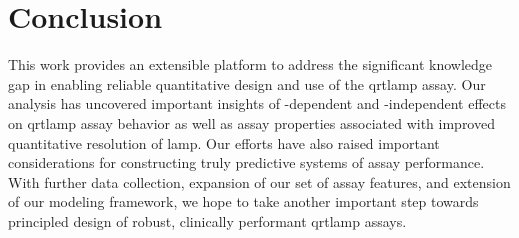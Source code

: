 \documentclass[../thesis.tex]{subfiles}
\begin{document}



%
%






\section{Conclusion}

This work provides an extensible platform to address the significant knowledge gap in enabling reliable quantitative design and use of the \gls{qrtlamp} assay. 
Our analysis has uncovered important insights of -dependent and -independent effects on \gls{qrtlamp} assay behavior as well as assay properties associated with improved quantitative resolution of \gls{lamp}. Our efforts have also raised important considerations for constructing truly predictive systems of assay performance. With further data collection, expansion of our set of assay features, and extension of our modeling framework, we hope to take another important step towards principled design of robust, clinically performant \gls{qrtlamp} assays. 





\dobib %
\end{document}

